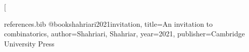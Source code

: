 
\renewcommand{\labelenumi}{\alph{enumi})}
\newcommand{\Z}{\mathbb Z}
\newcommand{\R}{\mathbb R}
\newcommand{\Q}{\mathbb Q}
\newcommand{\NN}{\mathbb N}
\newcommand{\PP}{\mathbb P}
\DeclareMathOperator{\Mod}{Mod} 
\renewcommand\lstlistingname{Algorithm}
\renewcommand\lstlistlistingname{Algorithms}
\def\lstlistingautorefname{Alg.}
\newtheorem*{theorem}{Theorem}
\newtheorem*{lemma}{Lemma}
\newtheorem{case}{Case}
\newcommand{\assign}{:=}
\newcommand{\infixiff}{\text{ iff }}
\newcommand{\nobracket}{}
\newcommand{\backassign}{=:}
\newcommand{\tmmathbf}[1]{\ensuremath{\boldsymbol{#1}}}
\newcommand{\tmop}[1]{\ensuremath{\operatorname{#1}}}
\newcommand{\tmtextbf}[1]{\text{{\bfseries{#1}}}}
\newcommand{\tmtextit}[1]{\text{{\itshape{#1}}}}

\newcommand*{\mkbibnextfootnotetext}[1]{\nextfootnotetext{\blxmkbibnote{foot}{#1}}}
\DeclareCiteCommand{\footcitetext}[\mkbibnextfootnotetext]
  {}
  {%
    }
  {\multicitedelim}
  {}

\makeatletter
\renewcommand*\env@matrix[2][1.0]{%
  \edef\arraystretch{#1}%
  \hskip -\arraycolsep
  \let\@ifnextchar\new@ifnextchar
  \array{#2}
}
\makeatother

\theoremstyle{definition}
\allowdisplaybreaks
\newtheorem{dinhly}{Định lý}
\newtheorem{dinhnghia}{Định nghĩa}
\newtheorem{vidu}{Ví dụ}
\newtheorem{hequa}{Hệ quả}
\newtheorem{bode}{Bổ đề}
\newtheorem{baitoan}{Bài toán}
\newtheorem{luuy}{Lưu ý}
\newtheorem{nhanxet}{Nhận xét}

\begin{filecontents}{references.bib}
  @book{shahriari2021invitation,
    title={An invitation to combinatorics},
    author={Shahriari, Shahriar},
    year={2021},
    publisher={Cambridge University Press}
  }
\end{filecontents}

\newcommand{\genstirlingI}[3]{%
	\genfrac{[}{]}{0pt}{#1}{#2}{#3}%
}
\newcommand{\genstirlingII}[3]{%
	\genfrac{\{}{\}}{0pt}{#1}{#2}{#3}%
}
\newcommand{\stirlingI}[2]{\genstirlingI{}{#1}{#2}}
\newcommand{\dstirlingI}[2]{\genstirlingI{0}{#1}{#2}}
\newcommand{\tstirlingI}[2]{\genstirlingI{1}{#1}{#2}}
\newcommand{\stirlingII}[2]{\genstirlingII{}{#1}{#2}}
\newcommand{\dstirlingII}[2]{\genstirlingII{0}{#1}{#2}}
\newcommand{\tstirlingII}[2]{\genstirlingII{1}{#1}{#2}}

\setlength\parindent{0pt}
\def\multiset#1#2{\ensuremath{\left(\kern-.3em\left(\genfrac{}{}{0pt}{}{#1}{#2}\right)\kern-.3em\right)}}
\usepackage{breakurl}

